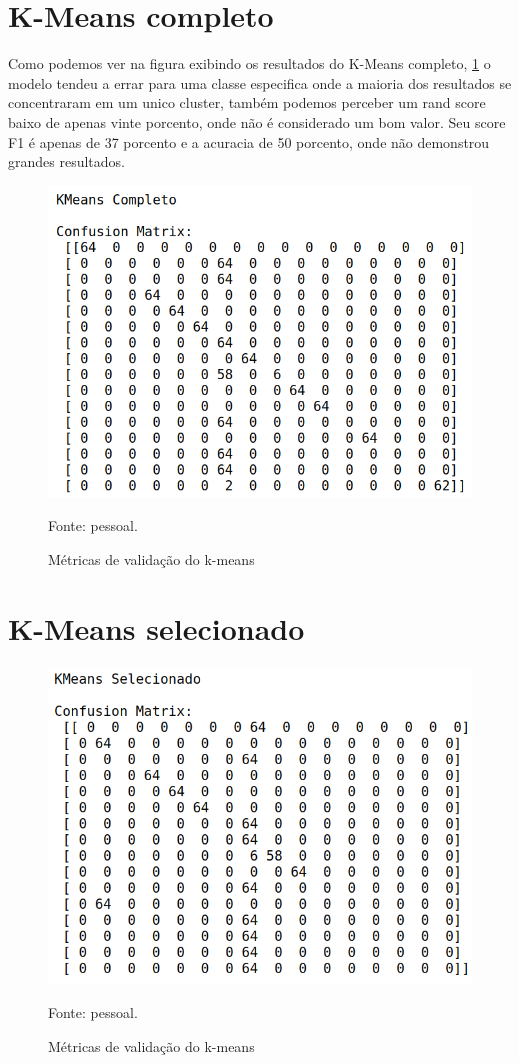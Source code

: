 \section{K-Means completo}

Como podemos ver na figura exibindo os resultados do K-Means completo, \ref{fig:resultKMeansCompleto} o modelo tendeu a errar para uma classe especifica onde a maioria dos resultados se concentraram em um unico cluster, também podemos perceber um rand score baixo de apenas vinte porcento, onde não é considerado um bom valor. Seu score F1 é apenas de 37 porcento e a acuracia de 50 porcento, onde não demonstrou grandes resultados.

\begin{figure}[h]
	\centering
	\includegraphics[width=0.7\linewidth]{images/resultKmeansCompleto}
	\caption{Métricas de validação do k-means}
	Fonte: pessoal.
	\label{fig:resultKMeansCompleto}
\end{figure}

\section{K-Means selecionado}

\begin{figure}[h]
	\centering
	\includegraphics[width=0.7\linewidth]{images/resultKmeansSelecionado}
	\caption{Métricas de validação do k-means}
	Fonte: pessoal.
	\label{fig:resultKmeansSelecionado}
\end{figure}

